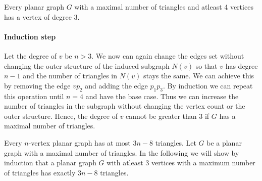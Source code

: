 \documentclass[a4paper]{article}
\begin{document}
\begin{solution}{21}
\begin{lemma}{Every planar graph $G$ with a maximal number of triangles and atleast 4 vertices has a vertex of degree 3.}
		\paragraph{Induction step}
		Let the degree of $v$ be $n>3$. 
		We now can again change the edges set without changing the outer structure of the induced subgraph $N(v)$ so that $v$ has degree $n-1$ and the number of triangles in $N(v)$ stays the same. 
		We can achieve this by removing the edge $v p_2$ and adding the edge $p_1 p_3$. 
		By induction we can repeat this operation until $n=4$ and have the base case. 
		Thus we can increase the number of triangles in the subgraph without changing the vertex count or the outer structure. 
		Hence, the degree of $v$ cannot be greater than 3 if $G$ has a maximal number of triangles.
		\begin{center}
		\end{center}
		
		\end{lemma}
		
		
		\begin{theorem}{Every $n$-vertex planar graph has at most $3n-8$ triangles.}
		Let $G$ be a planar graph with a maximal number of triangles. 
		In the following we will show by induction that a planar graph $G$ with atleast 3 vertices with a maximum number of triangles has exactly $3n-8$ triangles. 

\end{theorem}
\end{solution}
\end{document}
